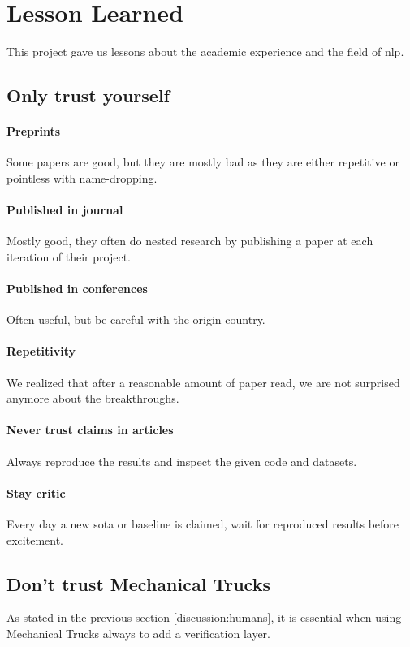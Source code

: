 \section{Lesson Learned}
This project gave us lessons about the academic experience and the field of \gls{nlp}.

\subsection{Only trust yourself}
\paragraph{Preprints} Some papers are good, but they are mostly bad as they are either repetitive or pointless with name-dropping.
\paragraph{Published in journal} Mostly good, they often do nested research by publishing a paper at each iteration of their project.
\paragraph{Published in conferences} Often useful, but be careful with the origin country.
\paragraph{Repetitivity} We realized that after a reasonable amount of paper read, we are not surprised anymore about the breakthroughs.
\paragraph{Never trust claims in articles} Always reproduce the results and inspect the given code and datasets.
\paragraph{Stay critic} Every day a new \gls{sota} or baseline is claimed, wait for reproduced results before excitement.

\subsection{Don't trust Mechanical Trucks}
As stated in the previous section \ref{discussion:humans}, it is essential when using Mechanical Trucks always to add a verification layer.


